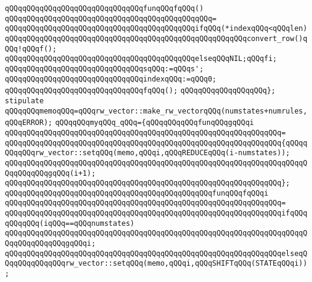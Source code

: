 \verb|qQQqqQQqqQQqqQQqqQQqqQQqqQQqqQQqfunqQQqfqQQq()|\newline
\verb|qQQqqQQqqQQqqQQqqQQqqQQqqQQqqQQqqQQqqQQqqQQqqQQq=|\newline
\verb|qQQqqQQqqQQqqQQqqQQqqQQqqQQqqQQqqQQqqQQqqQQqifqQQq(*indexqQQq<qQQqlen)|\newline
\verb|qQQqqQQqqQQqqQQqqQQqqQQqqQQqqQQqqQQqqQQqqQQqqQQqqQQqqQQqconvert_row()qQQq!qQQqf();|\newline
\verb|qQQqqQQqqQQqqQQqqQQqqQQqqQQqqQQqqQQqqQQqqQQqelseqQQqNIL;qQQqfi;|\newline
\verb|qQQqqQQqqQQqqQQqqQQqqQQqqQQqqQQqsqQQq:=qQQqs';|\newline
\verb|qQQqqQQqqQQqqQQqqQQqqQQqqQQqqQQqindexqQQq:=qQQq0;|\newline
\verb|qQQqqQQqqQQqqQQqqQQqqQQqqQQqqQQqfqQQq();|\newline
\verb|qQQqqQQqqQQqqQQqqQQq};|\newline
\newline
\verb|stipulate|\newline
\verb|qQQqqQQqmemoqQQq=qQQqrw_vector::make_rw_vectorqQQq(numstates+numrules,qQQqERROR);|\newline
\verb|qQQqqQQqmyqQQq_qQQq={qQQqqQQqqQQqfunqQQqgqQQqi|\newline
\verb|qQQqqQQqqQQqqQQqqQQqqQQqqQQqqQQqqQQqqQQqqQQqqQQqqQQqqQQqqQQqqQQq=|\newline
\verb|qQQqqQQqqQQqqQQqqQQqqQQqqQQqqQQqqQQqqQQqqQQqqQQqqQQqqQQqqQQqqQQq{qQQqqQQqqQQqrw_vector::setqQQq(memo,qQQqi,qQQqREDUCEqQQq(i-numstates));|\newline
\verb|qQQqqQQqqQQqqQQqqQQqqQQqqQQqqQQqqQQqqQQqqQQqqQQqqQQqqQQqqQQqqQQqqQQqqQQqqQQqqQQqgqQQq(i+1);|\newline
\verb|qQQqqQQqqQQqqQQqqQQqqQQqqQQqqQQqqQQqqQQqqQQqqQQqqQQqqQQqqQQqqQQq};|\newline
\newline
\verb|qQQqqQQqqQQqqQQqqQQqqQQqqQQqqQQqqQQqqQQqqQQqqQQqfunqQQqfqQQqi|\newline
\verb|qQQqqQQqqQQqqQQqqQQqqQQqqQQqqQQqqQQqqQQqqQQqqQQqqQQqqQQqqQQqqQQq=|\newline
\verb|qQQqqQQqqQQqqQQqqQQqqQQqqQQqqQQqqQQqqQQqqQQqqQQqqQQqqQQqqQQqqQQqifqQQqqQQqqQQq(iqQQq==qQQqnumstates)|\newline
\verb|qQQqqQQqqQQqqQQqqQQqqQQqqQQqqQQqqQQqqQQqqQQqqQQqqQQqqQQqqQQqqQQqqQQqqQQqqQQqqQQqqQQqgqQQqi;|\newline
\verb|qQQqqQQqqQQqqQQqqQQqqQQqqQQqqQQqqQQqqQQqqQQqqQQqqQQqqQQqqQQqqQQqelseqQQqqQQqqQQqqQQqrw_vector::setqQQq(memo,qQQqi,qQQqSHIFTqQQq(STATEqQQqi));|\newline
